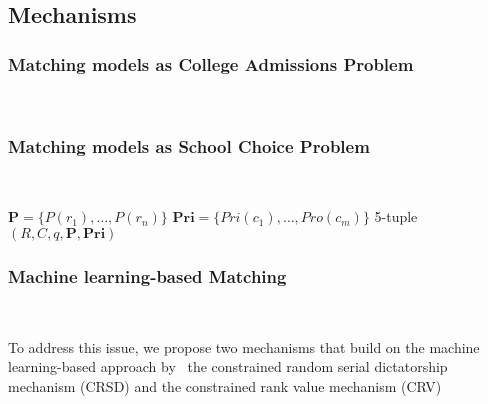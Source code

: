 \subsection{Mechanisms}\label{mechanisms}

\subsubsection{Matching models as College Admissions Problem}\label{matching-model-as-college-admissions-problem}~\citet{basshuysen}


    \subsubsection{Matching models as School Choice Problem}\label{matching-model-as-school-choice-problem}~\citet{basshuysen}


    \(\mathbf { P }= \{P(r_1), \dots, P(r_n)\}\)
    \(\mathbf { Pri } = \{Pri(c_1), \dots, Pro(c_m)\}\)
    5-tuple \( ( R , C , q , \mathbf { P } , \mathbf { Pri } ) \)

    \subsubsection{Machine learning-based Matching}\label{machine-learning-based-matching}~\citet{olbergml}


    To address this issue, we propose two mechanisms that build on the machine learning-based approach by~\citet{bansak_2018} the constrained random serial dictatorship mechanism
    (CRSD) and the constrained rank value mechanism (CRV)~\citet{olbergml} %

